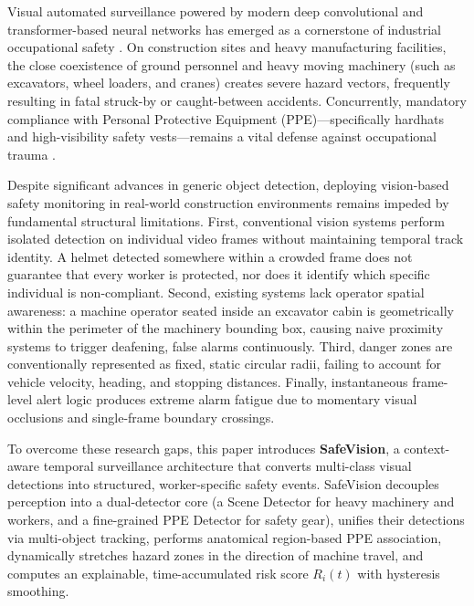 \documentclass[letterpaper, 10 pt, conference]{ieeeconf}
\begin{document}
Visual automated surveillance powered by modern deep convolutional and transformer-based neural networks has emerged as a cornerstone of industrial occupational safety \cite{lecun2015deep, an2021dataset}. On construction sites and heavy manufacturing facilities, the close coexistence of ground personnel and heavy moving machinery (such as excavators, wheel loaders, and cranes) creates severe hazard vectors, frequently resulting in fatal struck-by or caught-between accidents. Concurrently, mandatory compliance with Personal Protective Equipment (PPE)---specifically hardhats and high-visibility safety vests---remains a vital defense against occupational trauma \cite{wang2021fast, nath2020deep}.

Despite significant advances in generic object detection, deploying vision-based safety monitoring in real-world construction environments remains impeded by fundamental structural limitations. First, conventional vision systems perform isolated detection on individual video frames without maintaining temporal track identity. A helmet detected somewhere within a crowded frame does not guarantee that every worker is protected, nor does it identify which specific individual is non-compliant. Second, existing systems lack operator spatial awareness: a machine operator seated inside an excavator cabin is geometrically within the perimeter of the machinery bounding box, causing naive proximity systems to trigger deafening, false alarms continuously. Third, danger zones are conventionally represented as fixed, static circular radii, failing to account for vehicle velocity, heading, and stopping distances. Finally, instantaneous frame-level alert logic produces extreme alarm fatigue due to momentary visual occlusions and single-frame boundary crossings.

To overcome these research gaps, this paper introduces \textbf{SafeVision}, a context-aware temporal surveillance architecture that converts multi-class visual detections into structured, worker-specific safety events. SafeVision decouples perception into a dual-detector core (a Scene Detector for heavy machinery and workers, and a fine-grained PPE Detector for safety gear), unifies their detections via multi-object tracking, performs anatomical region-based PPE association, dynamically stretches hazard zones in the direction of machine travel, and computes an explainable, time-accumulated risk score $R_i(t)$ with hysteresis smoothing.
\end{document}

